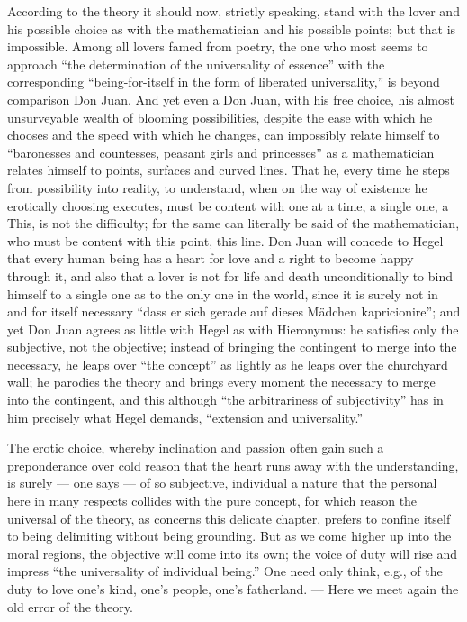\documentclass[12pt,a4paper,openany]{book}
\newcommand{\opage}[1]{\marginnote{\footnotesize\textit{[#1]}}}
\begin{document}
According to the theory it should now, strictly speaking, stand
with the lover and his possible choice as with the mathematician
and his possible points; but that is impossible.
Among all lovers famed from poetry, the one who most
seems to approach ``the determination of the universality of essence''
with the corresponding ``being-for-itself in the form
of liberated universality,'' is beyond comparison Don Juan.
\setcounter{footnote}{0}%
\opage{596}And yet even a Don Juan, with his free choice, his
almost unsurveyable wealth of blooming possibilities,
despite the ease with which he chooses and the speed
with which he changes, can impossibly relate himself to
``baronesses and countesses, peasant girls and princesses''
as a mathematician relates himself to points, surfaces
and curved lines. That he, every time he steps from possibility
into reality, to understand, when on the way of existence
he erotically choosing executes, must be content
with one at a time, a single one, a This, is not the difficulty;
for the same can literally be said of
the mathematician, who must be content with this point, this
line. Don Juan will concede to Hegel that every human being
has a heart for love and a right to become
happy through it, and also that a lover is not for life and
death unconditionally to bind himself to a single one as to the
only one in the world, since it is surely not in and for itself
necessary ``dass er sich gerade auf dieses Mädchen
kapricionire''; and yet Don Juan agrees as little with
Hegel as with Hieronymus: he satisfies only the
subjective, not the objective; instead of bringing the
contingent to merge into the necessary, he leaps
over ``the concept'' as lightly as he leaps over the churchyard wall;
he parodies the theory and brings every moment the necessary
to merge into the contingent, and this although
``the arbitrariness of subjectivity'' has in him precisely
what Hegel demands, ``extension and universality.''

The erotic choice, whereby inclination and passion
often gain such a preponderance over cold reason
that the heart runs away with the understanding, is surely
--- one says --- of so subjective, individual a nature that
\setcounter{footnote}{0}%
\opage{597}the personal here in many respects collides with
the pure concept, for which reason the universal of the theory, as concerns
this delicate chapter, prefers to confine itself to
being delimiting without being grounding. But
as we come higher up into the moral regions,
the objective will come into its own; the voice of duty
will rise and impress ``the universality of individual
being.'' One need only think, e.g., of the duty
to love one's kind, one's people, one's fatherland. --- Here we meet
again the old error of the theory.
\end{document}
